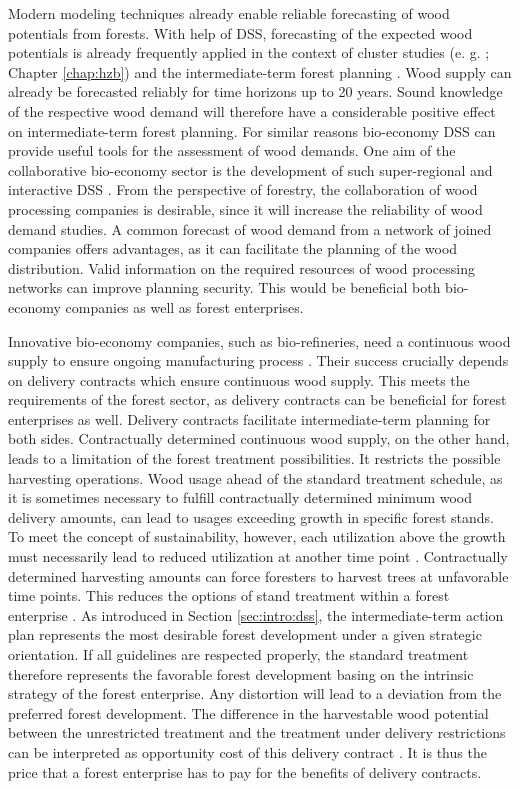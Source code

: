 Modern modeling techniques already enable reliable forecasting of wood potentials from forests. With help of DSS, forecasting of the expected wood potentials is already frequently applied in the context of cluster studies (e. g. \citealp{bmel_2016}; Chapter \ref{chap:hzb}) and the intermediate-term forest planning \citep[e.g.][]{bockmann_2004}. Wood supply can already be forecasted reliably for time horizons up to 20 years. Sound knowledge of the respective wood demand will therefore have a considerable positive effect on intermediate-term forest planning. For similar reasons bio-economy DSS can provide useful tools for the assessment of wood demands. One aim of the collaborative bio-economy sector is the development of such super-regional and interactive DSS \citep[p. 362]{ollikainen_2014}. From the perspective of forestry, the collaboration of wood processing companies is desirable, since it will increase the reliability of wood demand studies. A common forecast of wood demand from a network of joined companies offers advantages, as it can facilitate the planning of the wood distribution. Valid information on the required resources of wood processing networks can improve planning security. This would be beneficial both bio-economy companies as well as forest enterprises.

Innovative bio-economy companies, such as bio-refineries, need a continuous wood supply to ensure ongoing manufacturing process \citep[p. 362]{ollikainen_2014}. Their success crucially depends on delivery contracts which ensure continuous wood supply. This meets the requirements of the forest sector, as delivery contracts can be beneficial for forest enterprises as well. Delivery contracts facilitate intermediate-term planning for both sides. Contractually determined continuous wood supply, on the other hand, leads to a limitation of the forest treatment possibilities. It restricts the possible harvesting operations. Wood usage ahead of the standard treatment schedule, as it is sometimes necessary to fulfill contractually determined minimum wood delivery amounts, can lead to usages exceeding growth in specific forest stands. To meet the concept of sustainability, however, each utilization above the growth must necessarily lead to reduced utilization at another time point \citep[p. 67]{mohring_1997}. Contractually determined harvesting amounts can force foresters to harvest trees at unfavorable time points. This reduces the options of stand treatment within a forest enterprise \citep[p. 351-352]{mohring_2010}. As introduced in Section \ref{sec:intro:dss}, the intermediate-term action plan represents the most desirable forest development under a given strategic orientation. If all guidelines are respected properly, the standard treatment therefore represents the favorable forest development basing on the intrinsic strategy of the forest enterprise. Any distortion will lead to a deviation from the preferred forest development. The difference in the harvestable wood potential between the unrestricted treatment and the treatment under delivery restrictions can be interpreted as opportunity cost of this delivery contract \citep[p. 353]{mohring_2010}. It is thus the price that a forest enterprise has to pay for the benefits of delivery contracts.

